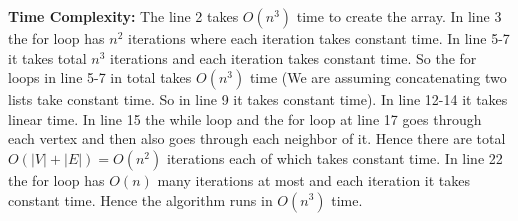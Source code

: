 \documentclass[a4paper, 11pt]{article}
\begin{document}
{\begin{algorithm}[H]
{{}
}
\caption{$(A,s,W)$}
\end{algorithm}\parinf

\textbf{Time Complexity:} The line 2 takes $O(n^3)$ time to create the array. In line 3 the for loop has $n^2$ iterations where each iteration takes constant time. In line 5-7 it takes total $n^3$ iterations and each iteration takes constant time. So the for loops in line 5-7 in total takes $O(n^3)$ time (We are assuming concatenating two lists take constant time. So in line 9 it takes constant time). In line 12-14 it takes linear time. In line 15 the while loop and the for loop at line 17 goes through each vertex and then also goes through each neighbor of it. Hence there are total $O(|V|+|E|)=O(n^2)$ iterations each of which takes constant time. In line 22 the for loop has $O(n)$ many iterations at most and each iteration it takes constant time. Hence the algorithm runs in $O(n^3)$ time. 
}


\end{document}
